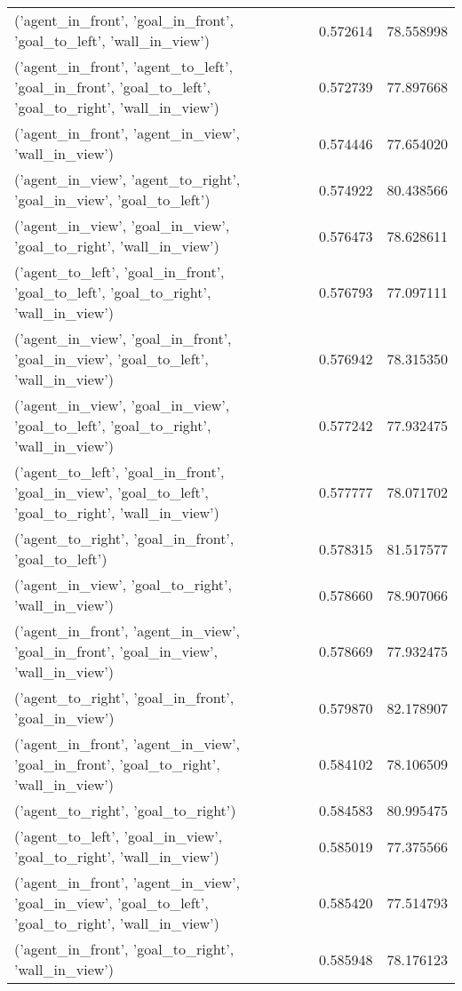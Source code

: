 \begin{tabular}{lrr}
('agent\_in\_front', 'goal\_in\_front', 'goal\_to\_left', 'wall\_in\_view') & 0.572614 & 78.558998 \\
('agent\_in\_front', 'agent\_to\_left', 'goal\_in\_front', 'goal\_to\_left', 'goal\_to\_right', 'wall\_in\_view') & 0.572739 & 77.897668 \\
('agent\_in\_front', 'agent\_in\_view', 'wall\_in\_view') & 0.574446 & 77.654020 \\
('agent\_in\_view', 'agent\_to\_right', 'goal\_in\_view', 'goal\_to\_left') & 0.574922 & 80.438566 \\
('agent\_in\_view', 'goal\_in\_view', 'goal\_to\_right', 'wall\_in\_view') & 0.576473 & 78.628611 \\
('agent\_to\_left', 'goal\_in\_front', 'goal\_to\_left', 'goal\_to\_right', 'wall\_in\_view') & 0.576793 & 77.097111 \\
('agent\_in\_view', 'goal\_in\_front', 'goal\_in\_view', 'goal\_to\_left', 'wall\_in\_view') & 0.576942 & 78.315350 \\
('agent\_in\_view', 'goal\_in\_view', 'goal\_to\_left', 'goal\_to\_right', 'wall\_in\_view') & 0.577242 & 77.932475 \\
('agent\_to\_left', 'goal\_in\_front', 'goal\_in\_view', 'goal\_to\_left', 'goal\_to\_right', 'wall\_in\_view') & 0.577777 & 78.071702 \\
('agent\_to\_right', 'goal\_in\_front', 'goal\_to\_left') & 0.578315 & 81.517577 \\
('agent\_in\_view', 'goal\_to\_right', 'wall\_in\_view') & 0.578660 & 78.907066 \\
('agent\_in\_front', 'agent\_in\_view', 'goal\_in\_front', 'goal\_in\_view', 'wall\_in\_view') & 0.578669 & 77.932475 \\
('agent\_to\_right', 'goal\_in\_front', 'goal\_in\_view') & 0.579870 & 82.178907 \\
('agent\_in\_front', 'agent\_in\_view', 'goal\_in\_front', 'goal\_to\_right', 'wall\_in\_view') & 0.584102 & 78.106509 \\
('agent\_to\_right', 'goal\_to\_right') & 0.584583 & 80.995475 \\
('agent\_to\_left', 'goal\_in\_view', 'goal\_to\_right', 'wall\_in\_view') & 0.585019 & 77.375566 \\
('agent\_in\_front', 'agent\_in\_view', 'goal\_in\_view', 'goal\_to\_left', 'goal\_to\_right', 'wall\_in\_view') & 0.585420 & 77.514793 \\
('agent\_in\_front', 'goal\_to\_right', 'wall\_in\_view') & 0.585948 & 78.176123 \\

\end{tabular}
